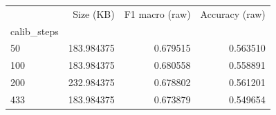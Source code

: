 \begin{tabular}{lrrr}
\toprule
 & Size (KB) & F1 macro (raw) & Accuracy (raw) \\
calib_steps &  &  &  \\
\midrule
50 & 183.984375 & 0.679515 & 0.563510 \\
100 & 183.984375 & 0.680558 & 0.558891 \\
200 & 232.984375 & 0.678802 & 0.561201 \\
433 & 183.984375 & 0.673879 & 0.549654 \\
\bottomrule
\end{tabular}
